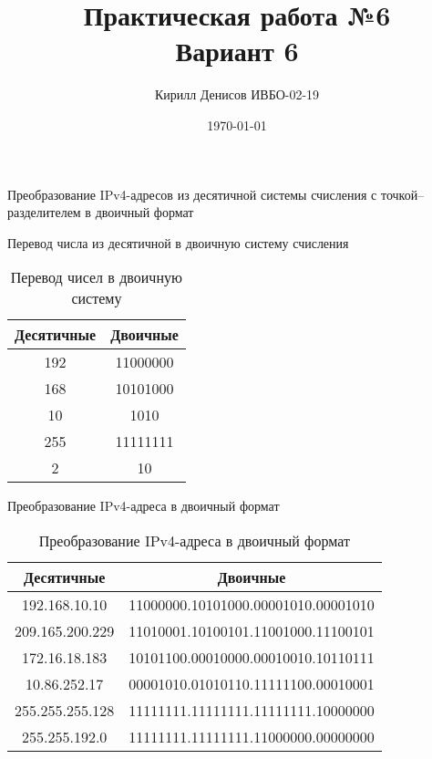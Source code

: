 \documentclass[a4paper,14pt]{extarticle}
\author{Кирилл Денисов ИВБО-02-19}
\title{Практическая работа №6\\Вариант 6}
\date{\today}
\newcommand{\pathToCommonFolder}{/home/denilai/Documents/repos/latex/Common}
\newcommand{\heading}[1]{\multicolumn{1}{|c|}{#1}}
\begin{document}
	\newpage
	\newpage
\maketitle


\begin{mypart}{Преобразование IPv4-адресов из десятичной системы счисления с точкой--разделителем в двоичный формат}

	\begin{step}{Перевод числа из десятичной в двоичную систему счисления}
		\begin{table}[h!]
			\caption{Перевод чисел в двоичную систему}
			\centering
			\begin{tabular}{|c|c|}
				\hline
				\heading{\textbf{Десятичные}} &\heading{\textbf{Двоичные}}\\\hline
					192 & 11000000 \\ \hline
					168 & 10101000 \\\hline
					10 &      1010 \\\hline
					255 & 11111111 \\\hline
					2 &         10 \\\hline
			\end{tabular}
		\label{tab:ten2two}
		\end{table}
	\end{step}

	\begin{step}{Преобразование IPv4-адреса в двоичный формат}
		\begin{table}[h!]
			\caption{Преобразование IPv4-адреса в двоичный формат}
			\centering
			\begin{tabular}{|c|r|}
				\hline
				\heading{\textbf{Десятичные}} &\heading{\textbf{Двоичные}}\\\hline
				192.168.10.10   & 11000000.10101000.00001010.00001010 \\\hline
				209.165.200.229 & 11010001.10100101.11001000.11100101 \\\hline
				172.16.18.183   & 10101100.00010000.00010010.10110111 \\\hline
				10.86.252.17    & 00001010.01010110.11111100.00010001 \\\hline
				255.255.255.128 & 11111111.11111111.11111111.10000000 \\\hline
				255.255.192.0   & 11111111.11111111.11000000.00000000 \\\hline
			\end{tabular}
			\label{tab:ip-42two}
		\end{table}
	\end{step}
\end{mypart}
\end{document}
